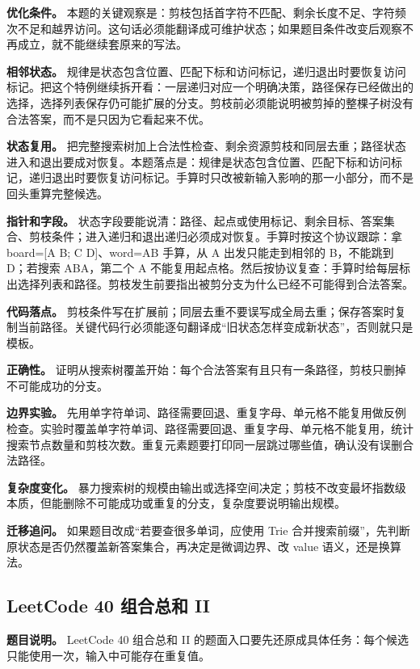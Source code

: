 \textbf{优化条件。} 本题的关键观察是：剪枝包括首字符不匹配、剩余长度不足、字符频次不足和越界访问。这句话必须能翻译成可维护状态；如果题目条件改变后观察不再成立，就不能继续套原来的写法。

\textbf{相邻状态。} 规律是状态包含位置、匹配下标和访问标记，递归退出时要恢复访问标记。把这个特例继续拆开看：一层递归对应一个明确决策，路径保存已经做出的选择，选择列表保存仍可能扩展的分支。剪枝前必须能说明被剪掉的整棵子树没有合法答案，而不是只因为它看起来不优。

\textbf{状态复用。} 把完整搜索树加上合法性检查、剩余资源剪枝和同层去重；路径状态进入和退出要成对恢复。本题落点是：规律是状态包含位置、匹配下标和访问标记，递归退出时要恢复访问标记。手算时只改被新输入影响的那一小部分，而不是回头重算完整候选。

\textbf{指针和字段。} 状态字段要能说清：路径、起点或使用标记、剩余目标、答案集合、剪枝条件；进入递归和退出递归必须成对恢复。手算时按这个协议跟踪：拿 board=[A B; C D]、word=AB 手算，从 A 出发只能走到相邻的 B，不能跳到 D；若搜索 ABA，第二个 A 不能复用起点格。然后按协议复查：手算时给每层标出选择列表和路径。剪枝发生前要指出被剪分支为什么已经不可能得到合法答案。

\textbf{代码落点。} 剪枝条件写在扩展前；同层去重不要误写成全局去重；保存答案时复制当前路径。关键代码行必须能逐句翻译成“旧状态怎样变成新状态”，否则就只是模板。

\textbf{正确性。} 证明从搜索树覆盖开始：每个合法答案有且只有一条路径，剪枝只删掉不可能成功的分支。

\textbf{边界实验。} 先用单字符单词、路径需要回退、重复字母、单元格不能复用做反例检查。实验时覆盖单字符单词、路径需要回退、重复字母、单元格不能复用，统计搜索节点数量和剪枝次数。重复元素题要打印同一层跳过哪些值，确认没有误删合法路径。

\textbf{复杂度变化。} 暴力搜索树的规模由输出或选择空间决定；剪枝不改变最坏指数级本质，但能删除不可能成功或重复的分支，复杂度要说明输出规模。

\textbf{迁移追问。} 如果题目改成“若要查很多单词，应使用 Trie 合并搜索前缀”，先判断原状态是否仍然覆盖新答案集合，再决定是微调边界、改 value 语义，还是换算法。

\subsection{LeetCode 40 组合总和 II}

\textbf{题目说明。} LeetCode 40 组合总和 II 的题面入口要先还原成具体任务：每个候选只能使用一次，输入中可能存在重复值。

